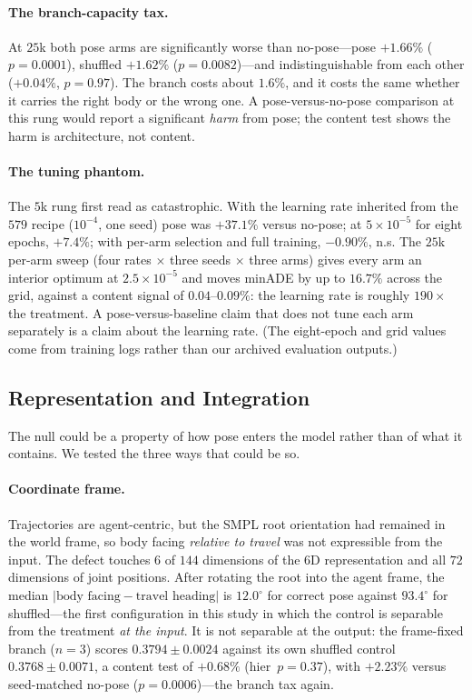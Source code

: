 \documentclass{article} %
\newcommand{\minADE}{minADE\xspace}
\begin{document}
\paragraph{The branch-capacity tax.}
At $25$k both pose arms are significantly worse than no-pose---pose $+1.66\%$
($p{=}0.0001$), shuffled $+1.62\%$ ($p{=}0.0082$)---and indistinguishable from
each other ($+0.04\%$, $p{=}0.97$). The branch costs about $1.6\%$, and it costs
the same whether it carries the right body or the wrong one. A pose-versus-no-pose
comparison at this rung would report a significant \emph{harm} from pose; the
content test shows the harm is architecture, not content.

\paragraph{The tuning phantom.}
The $5$k rung first read as catastrophic. With the learning rate inherited from
the $579$ recipe ($10^{-4}$, one seed) pose was $+37.1\%$ versus no-pose; at
$5{\times}10^{-5}$ for eight epochs, $+7.4\%$; with per-arm selection and full
training, $-0.90\%$, n.s. The $25$k per-arm sweep (four rates $\times$ three seeds
$\times$ three arms) gives every arm an interior optimum at $2.5{\times}10^{-5}$
and moves \minADE by up to $16.7\%$ across the grid, against a content signal of
$0.04$--$0.09\%$: the learning rate is roughly $190\times$ the treatment. A
pose-versus-baseline claim that does not tune each arm separately is a claim about
the learning rate. (The eight-epoch and grid values come from training logs rather
than our archived evaluation outputs.)

\subsection{Representation and Integration}
\label{sec:res_repr}

The null could be a property of how pose enters the model rather than of what it
contains. We tested the three ways that could be so.

\paragraph{Coordinate frame.}
Trajectories are agent-centric, but the SMPL root orientation had remained in the
world frame, so body facing \emph{relative to travel} was not expressible from the
input. The defect touches $6$ of $144$ dimensions of the 6D representation and all
$72$ dimensions of joint positions. After rotating the root into the agent frame,
the median $|\text{body facing} - \text{travel heading}|$ is $12.0^\circ$ for
correct pose against $93.4^\circ$ for shuffled---the first configuration in this
study in which the control is separable from the treatment \emph{at the input}. It
is not separable at the output: the frame-fixed branch ($n{=}3$) scores
$0.3794 \pm 0.0024$ against its own shuffled control $0.3768 \pm 0.0071$, a
content test of $+0.68\%$ (hier~$p{=}0.37$), with $+2.23\%$ versus seed-matched
no-pose ($p{=}0.0006$)---the branch tax again.
\end{document}
